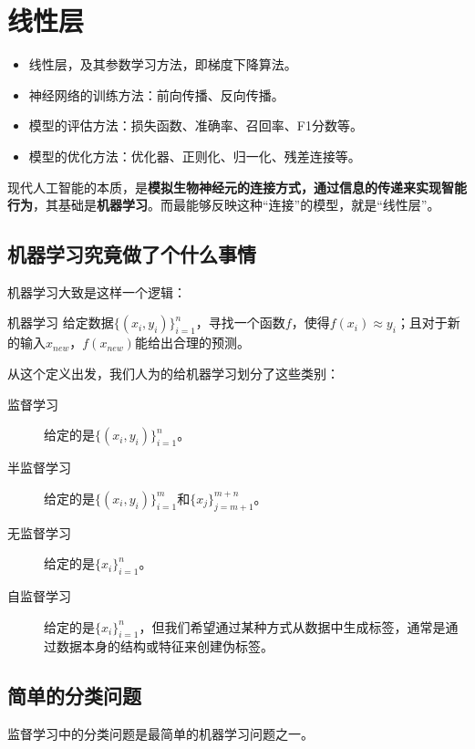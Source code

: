 \chapter{线性层}

\begin{intro}
    \begin{itemize}
        \item 线性层，及其参数学习方法，即梯度下降算法。
        \item 神经网络的训练方法：前向传播、反向传播。
        \item 模型的评估方法：损失函数、准确率、召回率、F1分数等。
        \item 模型的优化方法：优化器、正则化、归一化、残差连接等。
    \end{itemize}
\end{intro}

现代人工智能的本质，是\textbf{模拟生物神经元的连接方式，通过信息的传递来实现智能行为}，其基础是\textbf{机器学习}。而最能够反映这种“连接”的模型，就是“线性层”。

\section{机器学习究竟做了个什么事情}

机器学习大致是这样一个逻辑：
\begin{definition}{机器学习}{}
    给定数据$\{(x_i, y_i)\}_{i=1}^n$，寻找一个函数$f$，使得$f(x_i) \approx y_i$；且对于新的输入$x_{new}$，$f(x_{new})$能给出合理的预测。
\end{definition}

从这个定义出发，我们人为的给机器学习划分了这些类别：
\begin{description}
    \item[监督学习] 给定的是$\{(x_i, y_i)\}_{i=1}^n$。
    \item[半监督学习] 给定的是$\{(x_i, y_i)\}_{i=1}^m$和$\{x_j\}_{j=m+1}^{m+n}$。
    \item[无监督学习] 给定的是$\{x_i\}_{i=1}^n$。
    \item[自监督学习] 给定的是$\{x_i\}_{i=1}^n$，但我们希望通过某种方式从数据中生成标签，通常是通过数据本身的结构或特征来创建伪标签。
\end{description}

\section{简单的分类问题}

监督学习中的分类问题是最简单的机器学习问题之一。

